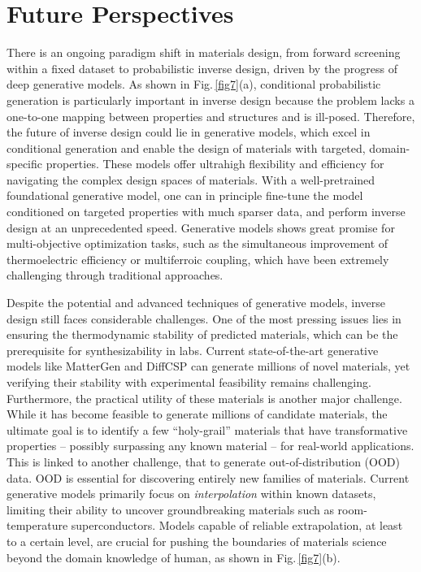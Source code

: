 \documentclass[fleqn,10pt]{wlscirep}
\begin{document}
\section{Future Perspectives}\label{future}
There is an ongoing paradigm shift in materials design, from forward screening within a fixed dataset to probabilistic inverse design, driven by the progress of deep generative models.
As shown in Fig.\,\ref{fig7}(a), conditional probabilistic generation is particularly important in inverse design because the problem lacks a one-to-one mapping between properties and structures and is ill-posed.
Therefore, the future of inverse design could lie in generative models, which excel in conditional generation and enable the design of materials with targeted, domain-specific properties.
These models offer ultrahigh flexibility and efficiency for navigating the complex design spaces of materials.
With a well-pretrained foundational generative model, one can in principle fine-tune the model conditioned on targeted properties with much sparser data\cite{zeni2025generative}, and perform inverse design at an unprecedented speed. 
Generative models shows great promise for multi-objective optimization tasks, such as the simultaneous improvement of thermoelectric efficiency\cite{yan2022high} or multiferroic coupling\cite{fiebig2016evolution}, which have been extremely challenging through traditional approaches.

Despite the potential and advanced techniques of generative models, inverse design still faces considerable challenges. 
One of the most pressing issues lies in ensuring the thermodynamic stability of predicted materials, which can be the prerequisite for synthesizability in labs. 
Current state-of-the-art generative models like MatterGen\cite{zeni2025generative} and DiffCSP\cite{jiao2023crystal} can generate millions of novel materials, yet verifying their stability with experimental feasibility remains challenging. 
Furthermore, the practical utility of these materials is another major challenge. While it has become feasible to generate millions of candidate materials, the ultimate goal is to identify a few ``holy-grail'' materials that have transformative properties -- possibly surpassing any known material -- for real-world applications. 
This is linked to another challenge, that to generate out-of-distribution (OOD) data. OOD is essential for discovering entirely new families of materials. 
Current generative models primarily focus on \textit{interpolation} within known datasets, limiting their ability to uncover groundbreaking materials such as room-temperature superconductors.  
Models capable of reliable extrapolation, at least to a certain level, are crucial for pushing the boundaries of materials science beyond the domain knowledge of human, as shown in Fig.\,\ref{fig7}(b).
\end{document}

